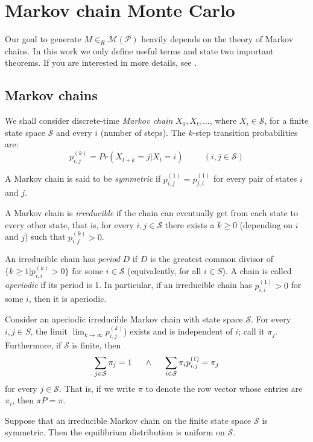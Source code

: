 \chapter{Markov chain Monte Carlo}
\label{chap:mcmc}
Our goal to generate $M\in_R\mathcal{M}(\mathcal{P})$ heavily depends on the theory of Markov chains. In this work we only define useful terms and state two important theorems. If you are interested in more details, see \cite{Madras}.

\section{Markov chains}
\begin{defn}
We shall consider discrete-time \emph{Markov chain} $X_0,X_l,\dots$, where $X_i\in\mathcal{S}$, for a finite state space $\mathcal{S}$ and every $i$ (number of steps). The $k$-step transition probabilities are:
$$p_{i,j}^{(k)}=Pr(X_{t+k}=j|X_t=i) \hspace{1cm} (i,j\in\mathcal{S})$$
\end{defn}
\begin{defn}
A Markov chain is said to be \emph{symmetric} if $p_{i,j}^{(1)}=p_{j,i}^{(1)}$ for every pair of states $i$ and $j$.
\end{defn}
\begin{defn}
A Markov chain is \emph{irreducible} if the chain can eventually get from each state to every other state, that is, for every $i,j\in\mathcal{S}$ there exists a $k\geq0$ (depending on $i$ and $j$) such that $p_{i,j}^{(k)}>0$.
\end{defn}
\begin{defn}
An irreducible chain has \emph{period} $D$ if $D$ is the greatest common divisor of $\{k\geq1|p_{i,i}^{(k)}>0\}$ for some $i\in\mathcal{S}$ (equivalently, for all $i\in S$). A chain is called \emph{aperiodic} if its period is 1. In particular, if an irreducible chain has $p_{i,i}^{(1)}>0$ for some $i$, then it is aperiodic.
\end{defn}
\begin{thm}
Consider an aperiodic irreducible Markov chain with state space $\mathcal{S}$. For every $i,j\in S$, the limit $\lim_{k\rightarrow\infty}p_{i,j}^{(k)}$) exists and is independent of $i$; call it $\pi_j$. Furthermore, if $\mathcal{S}$ is finite, then
$$\sum\limits_{j\in\mathcal{S}}\pi_j=1\hspace{5mm}\wedge\hspace{5mm}\sum\limits_{i\in\mathcal{S}}\pi_ip_{i,j}^{(1)}=\pi_j$$
for every $j\in\mathcal{S}$. That is, if we write $\pi$ to denote the row vector whose entries are $\pi_i$, then $\pi P=\pi$.
\end{thm}
\begin{thm}
Suppose that an irreducible Markov chain on the finite state space $\mathcal{S}$ is symmetric. Then the equilibrium distribution is uniform on $\mathcal{S}$.
\end{thm}


